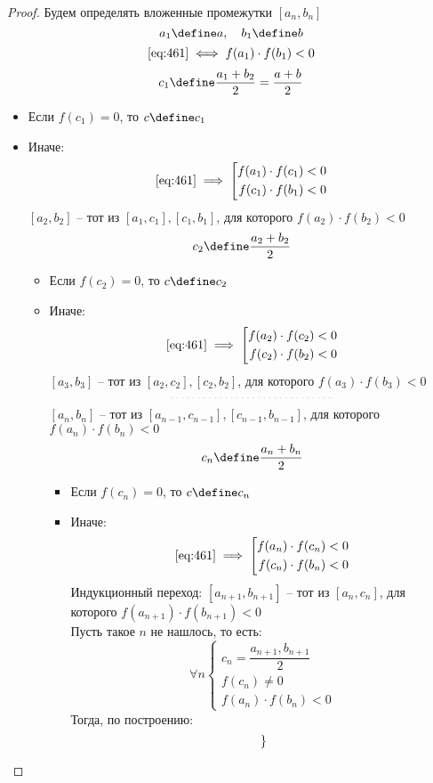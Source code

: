 \begin{proof}
	Будем определять вложенные промежутки $[a_n, b_n]$
	$$ a_1 \define a, \quad b_1 \define b $$
	$$ \eref{461} \iff f(a_1) \cdot f(b_1) < 0 $$
	$$ c_1 \define \frac{a_1 + b_2}2 = \frac{a + b}2 $$
	\begin{itemize}
		\item Если $f(c_1) = 0$, то $c \define c_1$
		\item Иначе:
		$$ \eref{461} \implies \left[
		\begin{aligned}
			f(a_1) \cdot f(c_1) < 0 \\
			f(c_1) \cdot f(b_1) < 0
		\end{aligned} \right. $$
		$ [a_2, b_2] $ -- тот из $[a_1, c_1], [c_1, b_1] $, для которого $ f(a_2) \cdot f(b_2) < 0 $
		$$ c_2 \define \frac{a_2 + b_2}2 $$
		\begin{itemize}
			\item Если $f(c_2) = 0$, то $c \define c_2$
			\item Иначе:
			$$ \eref{461} \implies \left[
			\begin{aligned}
				f(a_2) \cdot f(c_2) < 0 \\
				f(c_2) \cdot f(b_2) < 0
			\end{aligned} \right. $$
			$[a_3, b_3]$ -- тот из $[a_2, c_2], [c_2, b_2] $, для которого $ f(a_3) \cdot f(b_3) < 0 $
			$$ \widedots $$
			$[a_n, b_n]$ -- тот из $[a_{n - 1}, c_{n - 1}], [c_{n - 1}, b_{n - 1}]$, для которого $ f(a_n) \cdot f(b_n) < 0 $
			$$ c_n \define \frac{a_n + b_n}2 $$
			\begin{itemize}
				\item Если $f(c_n) = 0$, то $c \define c_n$
				\item Иначе:
				$$ \eref{461} \implies \left[
				\begin{aligned}
					f(a_n) \cdot f(c_n) < 0 \\
					f(c_n) \cdot f(b_n) < 0
				\end{aligned} \right. $$
				Индукционный переход: $[a_{n + 1}, b_{n + 1}]$ -- тот из $[a_n, c_n]$, для которого $f(a_{n + 1}) \cdot f(b_{n + 1}) < 0 $ \\
				Пусть такое $n$ не нашлось, то есть:
				$$ \forall n
				\begin{cases}
					c_n = \dfrac{a_{n + 1}, b_{n + 1}}2 \\
					f(c_n) \ne 0 \\
					f(a_n) \cdot f(b_n) < 0
				\end{cases} $$
				Тогда, по построению:
				$$ \begin{rcases}

\end{rcases}$$
\end{itemize}
\end{itemize}
\end{itemize}
\end{proof}
